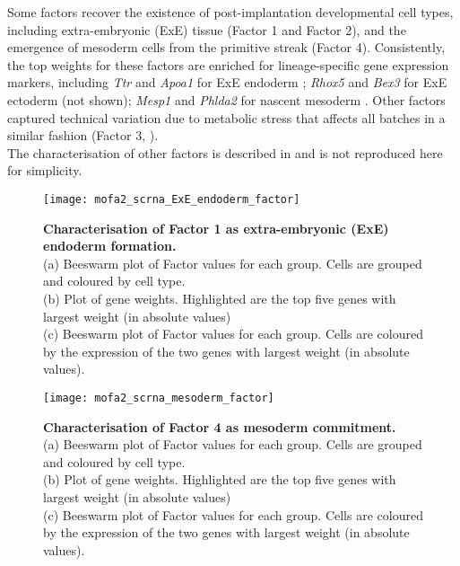 Some factors recover the existence of post-implantation developmental cell types, including extra-embryonic (ExE) tissue (Factor 1 and Factor 2), and the emergence of mesoderm cells from the primitive streak (Factor 4). Consistently, the top weights for these factors are enriched for lineage-specific gene expression markers, including \textit{Ttr} and \textit{Apoa1} for ExE endoderm ; \textit{Rhox5} and \textit{Bex3} for ExE ectoderm (not shown); \textit{Mesp1} and \textit{Phlda2} for nascent mesoderm . Other factors captured technical variation due to metabolic stress that affects all batches in a similar fashion (Factor 3, ).\\
The characterisation of other factors is described in\cite{Argelaguet2020} and is not reproduced here for simplicity.

\begin{figure}[H]
	\centering
	\texttt{[image: mofa2\_scrna\_ExE\_endoderm\_factor]}
	\caption[]{
	\textbf{Characterisation of Factor 1 as extra-embryonic (ExE) endoderm formation.} \\
	(a) Beeswarm plot of Factor values for each group. Cells are grouped and coloured by cell type. \\
	(b) Plot of gene weights. Highlighted are the top five genes with largest weight (in absolute values) \\
	(c) Beeswarm plot of Factor values for each group. Cells are coloured by the expression of the two genes with largest weight (in absolute values).
	}
	\label{fig:mofa2_scrna_ExE_endoderm_factor}
\end{figure}

\begin{figure}[H]
	\centering
	\texttt{[image: mofa2\_scrna\_mesoderm\_factor]}
	\caption[]{\textbf{Characterisation of Factor 4 as mesoderm commitment.} \\
	(a) Beeswarm plot of Factor values for each group. Cells are grouped and coloured by cell type. \\
	(b) Plot of gene weights. Highlighted are the top five genes with largest weight (in absolute values) \\
	(c) Beeswarm plot of Factor values for each group. Cells are coloured by the expression of the two genes with largest weight (in absolute values).
	}
	\label{fig:mofa2_scrna_mesoderm_factor}
\end{figure} 

